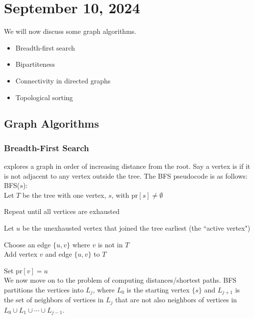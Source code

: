 \documentclass[12pt]{scrartcl}
\begin{document}
\section{September 10, 2024}
We will now discuss some graph algorithms.

\begin{itemize}
    \item Breadth-first search
    \item Bipartiteness
    \item Connectivity in directed graphs
    \item Topological sorting
\end{itemize}

\subsection{Graph Algorithms}

\subsubsection{Breadth-First Search}

 explores a graph in order of increasing distance from the root. Say a vertex is  if it is not adjacent to any vertex outside the tree. The BFS pseudocode is as follows: \\

BFS($s$): \\
\hspace{2mm} Let $T$ be the tree with one vertex, $s$, with $\text{pr}[s] \neq \emptyset$

\hspace{2mm} Repeat until all vertices are exhausted

\hspace{4mm}
Let $u$ be the unexhausted vertex that joined the tree earliest (the ``active vertex")

\hspace{4mm}
Choose an edge $\{u, v\}$ where $v$ is not in $T$ \\

\hspace{4mm}
Add vertex $v$ and edge $\{u, v\}$ to $T$

\hspace{4mm}
Set $\text{pr}[v] = u$ \\


We now move on to the problem of computing distances/shortest paths. BFS partitions the vertices into  $L_j$, where $L_0$ is the starting vertex $\{s\}$ and $L_{j+1}$ is the set of neighbors of vertices in $L_j$ that are not also neighbors of vertices in $L_0 \cup L_1 \cup \cdots \cup L_{j-1}$.
\end{document}
